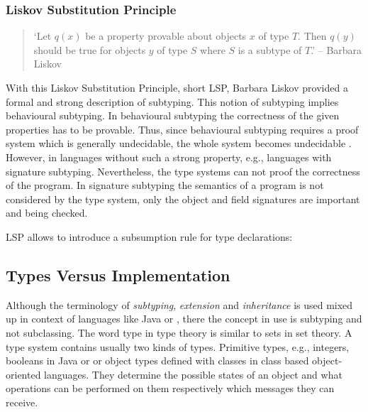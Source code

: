 \subsubsection{Liskov Substitution Principle}
\begin{quotation}
`Let $q(x)$ be a property provable about objects $x$ of type $T$. Then
$q(y)$ should be true for objects $y$ of type $S$ where $S$ is a subtype
of $T$.' -- Barbara Liskov \cite{liskov_behavioral_2001}
\end{quotation}

With this Liskov Substitution Principle, short LSP, Barbara Liskov
provided a formal and strong description  of subtyping. This
notion of subtyping implies behavioural subtyping. In behavioural
subtyping the correctness of the given properties has to be
provable. Thus, since behavioural subtyping requires a proof system
which is generally undecidable, the whole system becomes undecidable
\cite{poll_behavioural_1998}. However, in languages without such a strong
property, e.g., languages with signature subtyping. Nevertheless, the
type systems can not proof the correctness of the program. In signature
subtyping the semantics of a program is not considered by the type system,
only the object and field signatures are important and being checked.

LSP allows to introduce a subsumption rule for type declarations:

\begin{defn}[Subsumption]
\label{def:subsumption}
	\begin{mathpar}
	\end{mathpar}
\end{defn}

\subsection{Types Versus Implementation}
\label{sec:sharingTypes}
Although the terminology of \emph{subtyping}, \emph{extension} and
\emph{inheritance} is used mixed up in context of languages like Java
or \cpp, there the concept in use is subtyping and not subclassing.
The word type in type theory is similar to sets in set theory. A
type system contains usually two kinds of types. Primitive types,
e.g., integers, booleans in Java or \cpp or object types defined with
classes in class based object-oriented languages. They determine the
possible states of an object and what operations can be performed on them
respectively which messages they can receive.

